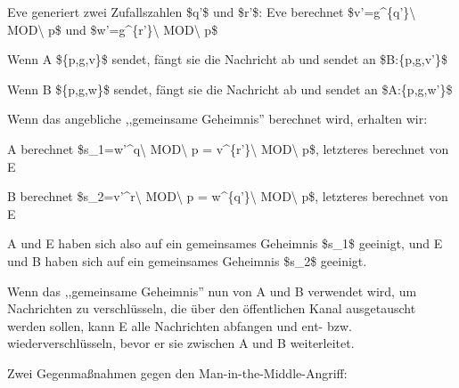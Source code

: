 \documentclass[a4paper]{article}
\begin{document}
\begin{multicols}{3}
\begin{itemize*}
            \begin{itemize*}
                  \item Eve generiert zwei Zufallszahlen \$q'\$ und \$r'\$: Eve berechnet \$v'=g\^{}\{q'\}\textbackslash{} MOD\textbackslash{} p\$ und \$w'=g\^{}\{r'\}\textbackslash{} MOD\textbackslash{} p\$
                  \item Wenn A \$\{p,g,v\}\$ sendet, fängt sie die Nachricht ab und sendet an \$B:\{p,g,v'\}\$
                  \item Wenn B \$\{p,g,w\}\$ sendet, fängt sie die Nachricht ab und sendet an \$A:\{p,g,w'\}\$
                  \item Wenn das angebliche ,,gemeinsame Geheimnis'' berechnet wird, erhalten wir:
                  \begin{itemize*} \item A berechnet \$s\_1=w'\^{}q\textbackslash{} MOD\textbackslash{} p = v\^{}\{r'\}\textbackslash{} MOD\textbackslash{} p\$, letzteres berechnet von E \item B berechnet \$s\_2=v'\^{}r\textbackslash{} MOD\textbackslash{} p = w\^{}\{q'\}\textbackslash{} MOD\textbackslash{} p\$, letzteres berechnet von E \item A und E haben sich also auf ein gemeinsames Geheimnis \$s\_1\$ geeinigt, und E und B haben sich auf ein gemeinsames Geheimnis \$s\_2\$ geeinigt. \end{itemize*}
                  \item Wenn das ,,gemeinsame Geheimnis'' nun von A und B verwendet wird, um Nachrichten zu verschlüsseln, die über den öffentlichen Kanal ausgetauscht werden sollen, kann E alle Nachrichten abfangen und ent- bzw. wiederverschlüsseln, bevor er sie zwischen A und B weiterleitet.
            \end{itemize*}
            \item
            Zwei Gegenmaßnahmen gegen den Man-in-the-Middle-Angriff:


\end{itemize*}
\end{multicols}
\end{document}
